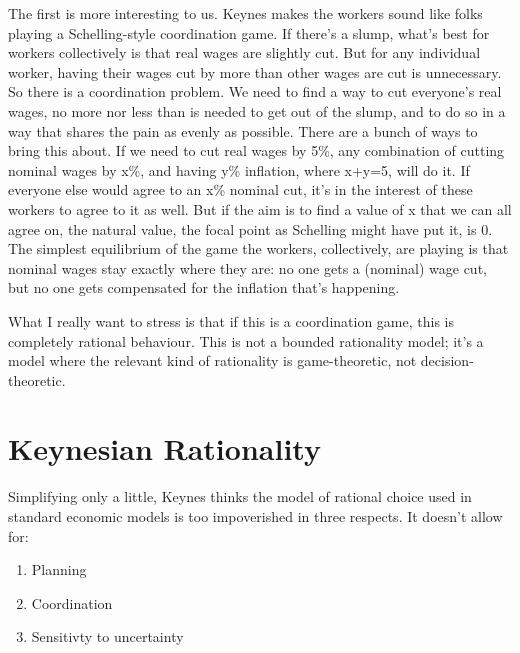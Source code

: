 \documentclass[
  11pt,
  letterpaper,
  DIV=11,
  numbers=noendperiod,
  oneside]{scrartcl}
\providecommand{\tightlist}{%
  \setlength{\itemsep}{0pt}\setlength{\parskip}{0pt}}\usepackage{longtable,booktabs,array}
\begin{document}
The first is more interesting to us. Keynes makes the workers sound like
folks playing a Schelling-style coordination game. If there's a slump, what's best for workers
collectively is that real wages are slightly cut. But for any individual
worker, having their wages cut by more than other wages are cut is
unnecessary. So there is a coordination problem. We need to find a way
to cut everyone's real wages, no more nor less than is needed to get out
of the slump, and to do so in a way that shares the pain as evenly as
possible. There are a bunch of ways to bring this
about. If we need to cut real wages by 5\%, any combination of cutting
nominal wages by x\%, and having y\% inflation, where x+y=5, will do it.
If everyone else would agree to an x\% nominal cut, it's in the interest
of these workers to agree to it as well. But if the aim is to find a
value of x that we can all agree on, the natural value, the focal point
as Schelling might have put it, is 0. The simplest equilibrium of the
game the workers, collectively, are playing is that nominal wages stay
exactly where they are: no one gets a (nominal) wage cut, but no one
gets compensated for the inflation that's happening.

What I really want to stress is that if this is a coordination game,
this is completely rational behaviour. This is not a bounded rationality
model; it's a model where the relevant kind of rationality is
game-theoretic, not decision-theoretic.

\section{Keynesian Rationality}\label{keynesian-rationality}

Simplifying only a little, Keynes thinks the model of rational choice
used in standard economic models is too impoverished in three respects.
It doesn't allow for:

\begin{enumerate}
\def\labelenumi{\arabic{enumi}.}
\tightlist
\item
  Planning
\item
  Coordination
\item
  Sensitivty to uncertainty
\end{enumerate}
\end{document}
